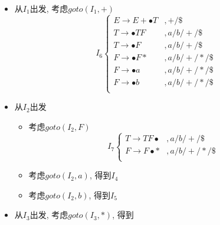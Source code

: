 \documentclass[UTF8]{article}
\newcommand{\blt}{\bullet}
\begin{document}
\begin{itemize}
\begin{itemize}
\begin{itemize}
$$\begin{array}{ll}
			F\rightarrow\blt a & ,a/b/+/*/\$\\
			F\rightarrow\blt b & ,a/b/+/*/\$\\
			\end{array}\right.$$
		\item 考虑$goto(I_0,F)$
			$$I_3\left\{\begin{array}{ll}
			T\rightarrow F\blt & , a/b/+/\$\\
			F\rightarrow F\blt * & , a/b/+/*/\$\\
			\end{array}\right.$$
		\item 考虑$goto(I_0,a)$
			$$I_4\left\{\begin{array}{ll}
			F\rightarrow a\blt & ,a/b/+/*/\$\\
			\end{array}\right.$$
		\item 考虑$goto(I_0,a)$
			$$I_5\left\{\begin{array}{ll}
			F\rightarrow b\blt & ,a/b/+/*/\$\\
			\end{array}\right.$$
		\end{itemize}
	\item 从$I_1$出发, 考虑$goto(I_1,+)$
		$$I_6\left\{\begin{array}{ll}
		E\rightarrow  E+\blt T & ,+/\$\\
		T\rightarrow\blt TF & ,a/b/+/\$\\
		T\rightarrow\blt F & , a/b/+/\$\\
		F\rightarrow\blt F* & , a/b/+/*/\$\\
		F\rightarrow\blt a & ,a/b/+/*/\$\\
		F\rightarrow\blt b & ,a/b/+/*/\$\\
		\end{array}\right.$$
	\item 从$I_2$出发
		\begin{itemize}
		\item 考虑$goto(I_2,F)$
			$$I_7\left\{\begin{array}{ll}
			T\rightarrow TF\blt & ,a/b/+/\$\\
			F\rightarrow F\blt * & , a/b/+/*/\$\\
			\end{array}\right.$$
		\item 考虑$goto(I_2,a)$, 得到$I_4$
		\item 考虑$goto(I_2,b)$, 得到$I_5$
		\end{itemize}
	\item 从$I_3$出发, 考虑$goto(I_3,*)$, 得到

\end{itemize}
\end{itemize}
\end{document}
